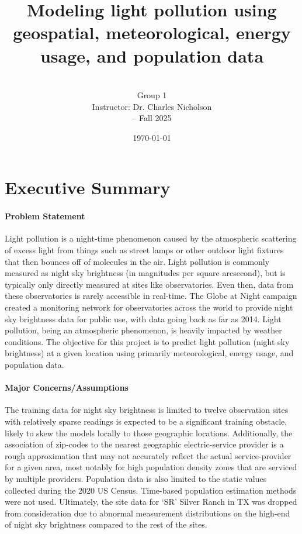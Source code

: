 \documentclass[11 pt]{article}  %
\title{Modeling light pollution using geospatial, meteorological, energy usage, 
       and population data}
\author{\myteam\\
        Group 1\\
        Instructor: Dr. Charles Nicholson\\
        \myclass -- Fall 2025}
\date{\today}
\begin{document}
\maketitle
\pagebreak

\tableofcontents
\listoffigures
\listoftables
\pagebreak

\setcounter{page}{1}
\section{Executive Summary}


\paragraph{Problem Statement} Light pollution is a night-time phenomenon
caused by the atmospheric scattering of excess light from things such as street 
lamps or other outdoor light fixtures that then bounces off of molecules in the air. 
Light pollution is commonly measured as night sky brightness (in magnitudes per square 
arcsecond), but is typically only directly measured at sites like observatories. 
Even then, data from these observatories is rarely accessible in real-time. The 
Globe at Night campaign created a monitoring network for observatories across the 
world to provide night sky brightness data for public use, with data going back 
as far as 2014. Light pollution, being an atmospheric phenomenon, is heavily 
impacted by weather conditions. The objective for this project is to predict light 
pollution (night sky brightness) at a given location using primarily meteorological, 
energy usage, and population data.

\paragraph{Major Concerns/Assumptions} The training data for night sky brightness
is limited to twelve observation sites with relatively sparse readings is expected 
to be a significant training obstacle, likely to skew the models locally to those
geographic locations. Additionally, the association of zip-codes to the
nearest geographic electric-service provider is a rough approximation that may not 
accurately reflect the actual service-provider for a given area, most notably for
high population density zones that are serviced by multiple providers. Population
data is also limited to the static values collected during the 2020 US Census. 
Time-based population estimation methods were not used. Ultimately, the site data
for `SR' Silver Ranch in TX was dropped from consideration due to abnormal measurement
distributions on the high-end of night sky brightness compared to the rest of the
sites.
\end{document}
